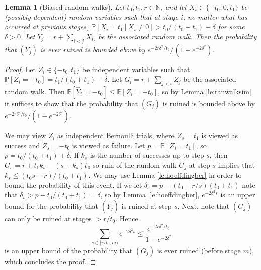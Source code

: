 \documentclass[11pt]{article}
\theoremstyle{plain}
\newtheorem{lem}[thm]{Lemma}
\numberwithin{equation}{subsection}
\newcommand{\Nat}{\mathbb{N}}
\DeclareRobustCommand{\proba}[2][{\mbox{$\mathbb{P}$}}]{\ensuremath {#1} [ {#2} ]}
\DeclareRobustCommand{\probac}[3][{\mbox{$\mathbb{P}$}}]{\ensuremath {#1}[ {#2} \ |\  {#3} ]}
\begin{document}
\begin{lem}[Biased random walks]\label{le:ranwalkbiasked}
Let $t_0,t_1,r \in\Nat$, and let $X_i\in\{-t_0,0,t_1\}$ be (possibly dependent) random variables such that at stage $i$, 
no matter what has occurred at previous stages, 
$\probac{X_i=t_1}{X_i\neq 0}>t_0/(t_0+t_1)+\delta$ for some $\delta>0$. 
Let $Y_j= r+\sum_{i<j} X_i$, 
be the associated random walk. Then the
probability that 
$(Y_j)$ is ever ruined is bounded above by $e^{-2r\delta^2/t_0}/(1-e^{-2\delta^2})$.
\end{lem}
\begin{proof}
 Let
$Z_i\in \{-t_0, t_1\}$ be independent variables such that
$\proba{Z_i=-t_0}= t_1/(t_0+t_1)-\delta$. 
Let $G_i=r+\sum_{j<i} Z_j$ be the associated random walk.
Then 
$\proba{\hat{Y}_i=-t_0}\leq\proba{Z_i=-t_0}$, so by Lemma \ref{le:ranwalksim}
it suffices to show that the probability that $(G_j)$ is ruined is bounded 
above by $e^{-2r\delta^2/t_0}/(1-e^{-2\delta^2})$.

We may view $Z_i$ as independent Bernoulli trials, 
where $Z_s=t_1$ is viewed as success and
$Z_s=-t_0$ is viewed as failure. Let 
$p=\proba{Z_i=t_1}$, so $p = t_0/(t_0+t_1) +\delta$. 
If $k_s$ is the number of successes up to step $s$,
then $G_s = r+t_1 k_s-(s-k_s)t_0$ so ruin of the random walk $G_j$ at step $s$ implies
that $k_s\leq (t_0s-r)/(t_0+t_1)$. We may 
use Lemma \ref{le:hoeffdingber}
in order to bound the probability of this event.
If we let $\delta_s=p-(t_0-r/s)(t_0+t_1)$ note that $\delta_s>p-t_0/(t_0+t_1)=\delta$, so 
by  Lemma \ref{le:hoeffdingber},
 $e^{-2\delta^2s}$ is an upper bound for the probability that $(\hat{Y}_j)$ is
ruined at step $s$.  Next, note that  $(G_j)$ can only be ruined at
stages $>r/t_0$. Hence 
\[
\sum_{s\in[ r/t_0, m)} e^{-2\delta^2s}\leq 
\frac{e^{-2r\delta^2/t_0}}{1-e^{-2\delta^2}}
\]
is an upper bound of the probability that $(G_j)$ is ever ruined (before stage $m$), which
concludes the proof.
\end{proof}
\end{document}

